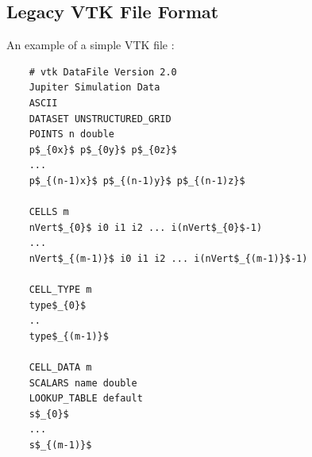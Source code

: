 \documentclass[preprint2]{aastex62}
\newcommand\aastex{AAS\TeX}
\begin{document}




\begin{appendix}
	\section{Legacy VTK File Format}
	An example of a simple VTK file \cite{Formats2009}:
	\begin{lstlisting}
	# vtk DataFile Version 2.0
	Jupiter Simulation Data
	ASCII
	DATASET UNSTRUCTURED_GRID
	POINTS n double
	p$_{0x}$ p$_{0y}$ p$_{0z}$
	...
	p$_{(n-1)x}$ p$_{(n-1)y}$ p$_{(n-1)z}$
	
	CELLS m 
	nVert$_{0}$ i0 i1 i2 ... i(nVert$_{0}$-1)
	...
	nVert$_{(m-1)}$ i0 i1 i2 ... i(nVert$_{(m-1)}$-1)
	
	CELL_TYPE m 
	type$_{0}$
	..
	type$_{(m-1)}$
	
	CELL_DATA m
	SCALARS name double
	LOOKUP_TABLE default
	s$_{0}$
	...
	s$_{(m-1)}$
	\end{lstlisting}
\end{appendix}
\end{document}
